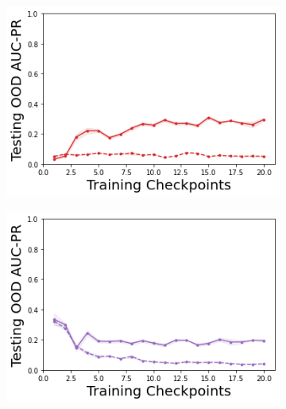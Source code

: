 \begin{figure}
    \begin{subfigure}{.24\textwidth}
        \includegraphics[width=\textwidth]{sections/011_icml2022/resources/DropOut-CartPoleOOD-v0-AUC-PR-out-epistemic_-testing-strategy.png}
    \end{subfigure}
    \begin{subfigure}{.24\textwidth}
        \includegraphics[width=\textwidth]{sections/011_icml2022/resources/Ensemble-CartPoleOOD-v0-AUC-PR-out-epistemic_-testing-strategy.png}
    \end{subfigure}
    \begin{subfigure}{.24\textwidth}

\end{subfigure}
\end{figure}
